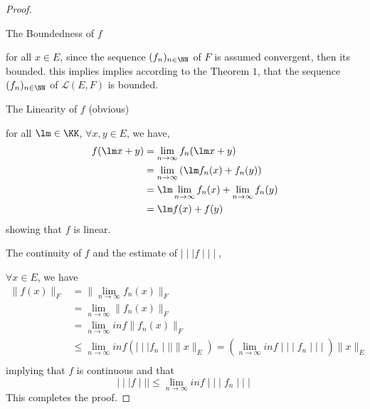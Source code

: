 \begin{proof}
	\begin{center}
		The Boundedness of $f $ 
	\end{center}
	
	for all $x  \in E$, since the sequence 
	$(f_{n}) _{n \in \NN} $  of $F $ is assumed 
	convergent, then its bounded. this implies 
	implies according to the Theorem $1 $, that the sequence
	$(f_{n}) _{n \in \NN} $ of $\mathcal{L} (E,F) $  is 
	bounded.
	\begin{center}
		The Linearity of $f $ (obvious) 
	\end{center}
	for all $\lm \in  \KK $, $\forall x,y \in  E $, we have, 
	\begin{align*}
		f(\lm x + y)  &= 
		\lim_{n \to \infty} f_{n}(\lm x + y)   \\
			      &= \lim_{n \to \infty} 
			      \left( \lm f_{n}(x)  + 
			      f_{n}(y) \right) \\
			      &= \lm \lim_{n \to \infty} 
			      f_{n}(x)  + 
			      \lim_{n \to \infty} f_{n}(y)  \\
			      &= \lm f(x) + f(y) 
	\end{align*}
	showing that $f $ is linear.
	\begin{center}
		The continuity of $f $ and the estimate of 
		$\mid \mid \mid  f \mid \mid \mid  $,
	\end{center}
	$\forall x \in E $, we have 
	\begin{align*}
		\| f(x)  \| _{F} &= 
		\| \lim_{n \to \infty} f_{n}(x)  \| _{F} \\
				 &= 
				 \lim_{n \to \infty} 
				 \| f_{n}(x)  \| _{F} \\
				 &= 
				 \lim_{n \to \infty} inf 
				 \| f_{n}(x)  \| _{F} \\
				 & \leq 
				 \lim_{n \to \infty} inf 
				 \left( 
					 \mid \mid \mid  f_{n} \mid \mid \mid  
					 \| x \| _{E}
				 \right) = 
				 \left( \lim_{n \to \infty} inf
				 \mid \mid \mid  f_{n} \mid \mid \mid 
			 \right) \| x \| _{E}
				 \\ 
	\end{align*}
	implying that $f $ is continuous and that 
	\[
	\mid \mid \mid  f \mid \mid \mid  \leq \lim_{n \to \infty} inf
	\mid \mid \mid  f_{n} \mid \mid \mid 
	\]
	 This completes the proof.
\end{proof}
%
%
%
%
%
% 
